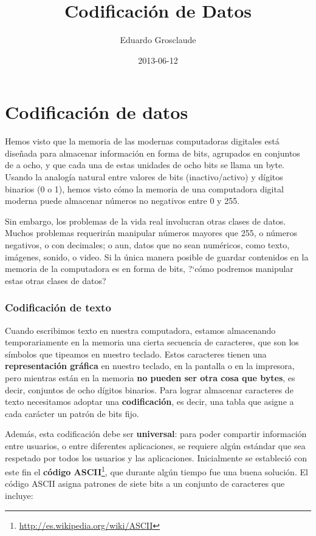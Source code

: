 \documentclass[a4paper]{article}
\title{Codificación de Datos}
\author{Eduardo Grosclaude}
\date{2013-06-12}
\begin{document}
\section{Codificaci\'on de datos}
Hemos visto que la memoria de las modernas computadoras digitales está
diseñada para almacenar informaci\'on en forma de bits, agrupados en
conjuntos de a ocho, y que cada una de estas unidades de ocho bits se
llama un byte. Usando la analog\'ia natural entre valores de bits
(inactivo/activo) y d\'igitos binarios (0 o 1), hemos visto c\'omo la
memoria de una computadora digital moderna puede almacenar n\'umeros no
negativos entre 0 y 255.

Sin embargo, los problemas de la vida real involucran otras clases de
datos. Muchos problemas requerir\'an manipular n\'umeros mayores que
255, o n\'umeros negativos, o con decimales; o aun, datos que no sean
num\'ericos, como texto, im\'agenes, sonido, o video. Si la \'unica
manera posible de guardar contenidos en la memoria de la computadora es
en forma de bits, ?`c\'omo podremos manipular estas otras clases de
datos?

\subsubsection{Codificaci\'on de texto}
Cuando escribimos texto en nuestra computadora, estamos almacenando
temporariamente en la memoria una cierta secuencia de caracteres, que
son los s\'imbolos que tipeamos en nuestro teclado. Estos caracteres
tienen una \textbf{representaci\'on gr\'afica} en nuestro teclado, en
la pantalla o en la impresora, pero mientras est\'an en la memoria
\textbf{no pueden ser otra cosa que bytes}, es decir, conjuntos de ocho
d\'igitos binarios. Para lograr almacenar caracteres de texto
necesitamos adoptar una \textbf{codificaci\'on}, es decir, una tabla
que asigne a cada car\'acter un patr\'on de bits fijo.

Adem\'as, esta codificaci\'on debe ser \textbf{universal}: para poder
compartir informaci\'on entre usuarios, o entre diferentes
aplicaciones, se requiere alg\'un est\'andar que sea respetado por
todos los usuarios y las aplicaciones. Inicialmente se estableci\'o con
este fin el \textbf{c\'odigo
ASCII}\footnote{\url{http://es.wikipedia.org/wiki/ASCII}}, que durante
alg\'un tiempo fue una buena soluci\'on. El c\'odigo ASCII asigna
patrones de siete bits a un conjunto de caracteres que incluye:
\end{document}
